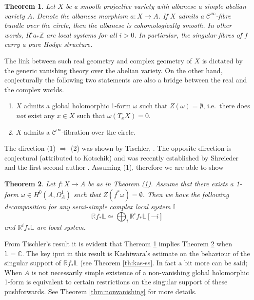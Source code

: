 \documentclass[12pt,reqno]{amsart}
\newtheorem{alphtheorem}{Theorem}
\theoremstyle{question}
\theoremstyle{definition}
\theoremstyle{remark}
\theoremstyle{cited}
\theoremstyle{citeddef}
\newcommand{\bbC}{\mathbb{C}}
\newcommand{\bbL}{\mathbb{L}}
\newcommand{\bbR}{\mathbb{R}}
\newcommand{\bbZ}{\mathbb{Z}}
\newcommand{\scrC}{\mathscr{C}}
\begin{document}
\begin{alphtheorem}\label{thm:smooth}
Let $X$ be a smooth projective variety with albanese a simple abelian variety $A$. Denote the albanese morphism $a\colon X\to A$. If $X$ admits a $\scrC^{\infty}$-fibre bundle over the circle, then the albanese is cohomologically smooth.
In other words, $R^ia_*\bbZ$ are local systems for 
all $i>0$.
In particular, the
singular fibres of $f$ carry a pure Hodge structure.
\end{alphtheorem}
The link between such
 real geometry and complex geometry of $X$ is dictated
by the generic vanishing theory over the abelian variety. 
On the other hand, conjecturally the following two statements
are also a bridge between the real and the complex worlds.
\begin{enumerate}
	\item $X$ admits a global holomorphic 1-form $\omega$
	such that $Z(\omega) = \emptyset$, i.e.\ there does \textsl{not}
	exist any $x\in X$ such that $\omega(T_xX) = 0$. 
	\item $X$ admits a $\scrC^{\infty}$-fibration over the circle.
\end{enumerate}
The direction (1) $\Rightarrow$ (2) was shown by Tischler,
\cite{Tis70}. The opposite direction is conjectural (attributed
to Kotschik) and
was recently established by Shreieder and the first second author
\cite{HS19}. Assuming (1), therefore we are able to show
\begin{alphtheorem}
Let $f\colon X\to A$ be as in Theorem (\ref{thm:smooth}). Assume 
that there exists a 1-form $\omega\in H^0(A,\Omega_A^1)$
such that $Z(f^*\omega) = \emptyset$. Then we have the following
decomposition for any semi-simple complex local system $\bbL$
\[\bbR f_*\bbL \simeq \bigoplus_i \bbR^i f_*\bbL[-i]\]
and $\bbR^i f_*\bbL$ are local system.
\label{thm:cxsmooth}
\end{alphtheorem}

From Tischler's result it is evident that Thereom \ref{thm:smooth}
implies Theorem \ref{thm:cxsmooth} when $\bbL = \bbC$. 
The key iput in this result is
Kashiwara's estimate on the behaviour of the singular
support of $\bbR f_*\bbL$ (see
Theorem \ref{th:kas-ss}. In fact a bit more can be said; When $A$ is not necessarily simple existence of a non-vanishing global holomorphic 1-form
is equivalent to certain restrictions on the singular support of 
these pushforwards. See Theorem \ref{thm:nonvanishing} for more details. 
\end{document}
